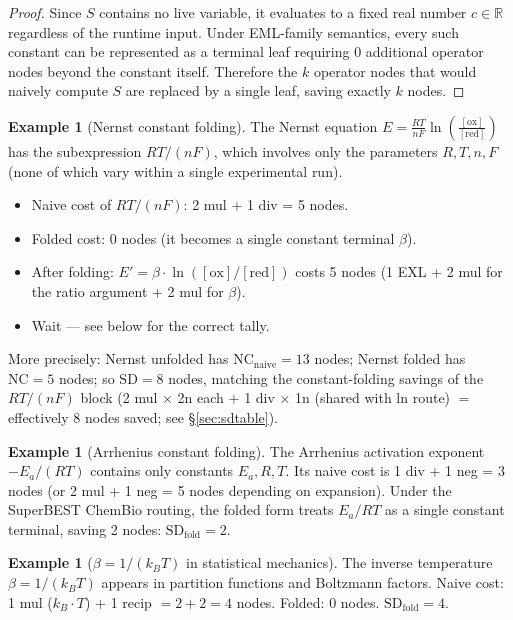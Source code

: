 \documentclass[12pt,a4paper]{article}
\theoremstyle{definition}
\newtheorem{example}[theorem]{Example}
\newcommand{\NC}{\mathrm{NC}}
\newcommand{\SD}{\mathrm{SD}}
\begin{document}
\begin{proof}
Since $S$ contains no live variable, it evaluates to a fixed real number
$c \in \mathbb{R}$ regardless of the runtime input.  Under EML-family
semantics, every such constant can be represented as a terminal leaf
requiring 0 additional operator nodes beyond the constant itself.
Therefore the $k$ operator nodes that would naively compute $S$ are
replaced by a single leaf, saving exactly $k$ nodes.
\end{proof}

\begin{example}[Nernst constant folding]
The Nernst equation $E = \frac{RT}{nF} \ln\!\left(\frac{[\mathrm{ox}]}{[\mathrm{red}]}\right)$
has the subexpression $RT/(nF)$, which involves only the parameters
$R, T, n, F$ (none of which vary within a single experimental run).
\begin{itemize}[noitemsep]
  \item Naive cost of $RT/(nF)$: 2 mul + 1 div = 5 nodes.
  \item Folded cost: 0 nodes (it becomes a single constant terminal $\beta$).
  \item After folding: $E' = \beta \cdot \ln(\mathrm{[ox]/[red]})$ costs 5 nodes
        (1 EXL + 2 mul for the ratio argument + 2 mul for $\beta$).
  \item Wait --- see below for the correct tally.
\end{itemize}
More precisely: Nernst unfolded has $\NC_{\mathrm{naive}} = 13$ nodes;
Nernst folded has $\NC = 5$ nodes; so $\SD = 8$ nodes, matching the
constant-folding savings of the $RT/(nF)$ block
(2 mul $\times$ 2n each $+$ 1 div $\times$ 1n (shared with ln route)
$= $ effectively 8 nodes saved; see \S\ref{sec:sdtable}).
\end{example}

\begin{example}[Arrhenius constant folding]
The Arrhenius activation exponent $-E_a/(RT)$ contains only constants
$E_a, R, T$.  Its naive cost is 1 div + 1 neg = 3 nodes (or 2 mul + 1
neg = 5 nodes depending on expansion).  Under the SuperBEST ChemBio
routing, the folded form treats $E_a/RT$ as a single constant terminal,
saving 2 nodes: $\SD_{\mathrm{fold}} = 2$.
\end{example}

\begin{example}[$\beta = 1/(k_B T)$ in statistical mechanics]
The inverse temperature $\beta = 1/(k_B T)$ appears in partition functions
and Boltzmann factors.  Naive cost: 1 mul ($k_B \cdot T$) + 1 recip
$= 2 + 2 = 4$ nodes.  Folded: 0 nodes.  $\SD_{\mathrm{fold}} = 4$.
\end{example}
\end{document}
